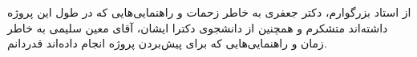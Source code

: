 


\begin{center}
\end{center}

از استاد بزرگوارم، دکتر جعفری به خاطر زحمات و راهنمایی‌هایی که در طول این پروژه داشته‌اند متشکرم و همچنین از دانشجوی دکترا ایشان، آقای معین سلیمی به خاطر زمان و راهنمایی‌هایی که برای پیش‌بردن پروژه انجام داده‌اند قدردانم.

